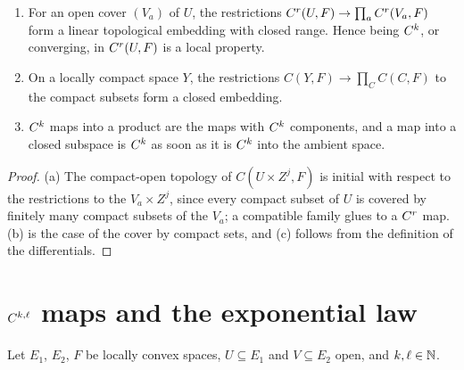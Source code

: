 \begin{proposition}
  \label{prop:ck-locality}
  \leanok
  \begin{enumerate}
    \item For an open cover $(V_a)$ of $U$, the restrictions
      $C^{r}(U, F) \to \prod_a C^{r}(V_a, F)$ form a linear topological embedding with closed
      range. Hence being $C^{k}$, or converging, in $C^{r}(U, F)$ is a local property.
    \item On a locally compact space $Y$, the restrictions $C(Y, F) \to \prod_C C(C, F)$ to the
      compact subsets form a closed embedding.
    \item $C^{k}$ maps into a product are the maps with $C^{k}$ components, and a map into a
      closed subspace is $C^{k}$ as soon as it is $C^{k}$ into the ambient space.
  \end{enumerate}
\end{proposition}

\begin{proof}
  \leanok
  (a) The compact-open topology of $C(U \times Z^j, F)$ is initial with respect to the
  restrictions to the $V_a \times Z^j$, since every compact subset of $U$ is covered by finitely
  many compact subsets of the $V_a$; a compatible family glues to a $C^{r}$ map. (b) is the case
  of the cover by compact sets, and (c) follows from the definition of the differentials.
\end{proof}

\section{\texorpdfstring{$C^{k,\ell}$}{Ckl} maps and the exponential law}
\label{sec:exponential-law}

Let $E_1$, $E_2$, $F$ be locally convex spaces, $U \subseteq E_1$ and $V \subseteq E_2$ open,
and $k, \ell \in \mathbb{N}$.

